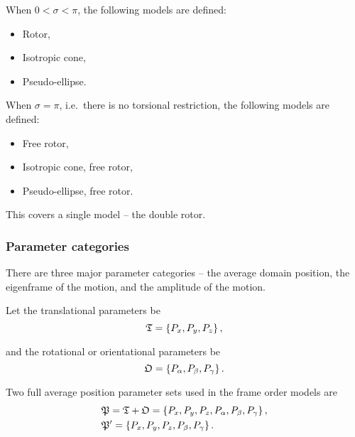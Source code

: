 
When $0 < \sigma < \pi$, the following models are defined:
\begin{itemize}
    \item Rotor,
    \item Isotropic cone,
    \item Pseudo-ellipse.
\end{itemize}



When $\sigma = \pi$, i.e.\ there is no torsional restriction, the following models are defined:
\begin{itemize}
    \item Free rotor,
    \item Isotropic cone, free rotor,
    \item Pseudo-ellipse, free rotor.
\end{itemize}



This covers a single model -- the double rotor.


\subsubsection{Parameter categories}

There are three major parameter categories -- the average domain position, the eigenframe of the motion, and the amplitude of the motion.



Let the translational parameters be
\begin{equation}
    \mathfrak{T} = \left\{ P_x, P_y, P_z \right\},
\end{equation}

and the rotational or orientational parameters be
\begin{equation}
    \mathfrak{O} = \left\{ P_\alpha, P_\beta, P_\gamma \right\}.
\end{equation}

Two full average position parameter sets used in the frame order models are
\begin{subequations}
\begin{align}
    &\mathfrak{P} = \mathfrak{T} + \mathfrak{O} = \left\{ P_x, P_y, P_z, P_\alpha, P_\beta, P_\gamma \right\}, \\
    &\mathfrak{P}' = \left\{ P_x, P_y, P_z, P_\beta, P_\gamma \right\}.
\end{align}
\end{subequations}


